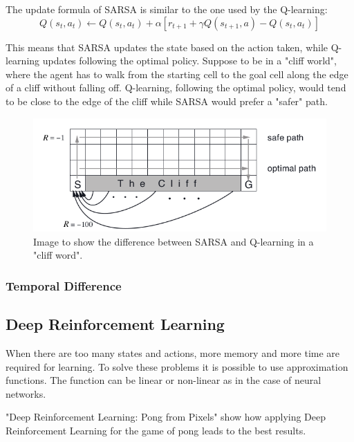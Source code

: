 The update formula of SARSA is similar to the one used by the Q-learning: 
\begin{equation*}
    Q(s_t, a_t) \leftarrow Q(s_t, a_t) + \alpha [r_{t+1} + \gamma Q(s_{t+1}, a) - Q(s_t, a_t)]    
\end{equation*}

This means that SARSA updates the state based on the action taken, while Q-learning updates following the optimal policy.
Suppose to be in a "cliff world", where the agent has to walk from the starting cell to the goal cell along the edge of a cliff without falling off. Q-learning, following the optimal policy, would tend to be close to the edge of the cliff while SARSA would prefer a "safer" path.

\begin{figure}[ht]
    \centering
    \includegraphics[scale=0.4]{images/cliff_word.png}
    \caption{Image to show the difference between SARSA and Q-learning in a "cliff word".}
\end{figure}

\subsubsection{Temporal Difference}

\subsection{Deep Reinforcement Learning}
When there are too many states and actions, more memory and more time are required for learning.
To solve these problems it is possible to use approximation functions.
The function can be linear \cite{melo2008analysis} or non-linear as in the case of neural networks.

\vspace*{4mm}
\noindent
"Deep Reinforcement Learning: Pong from Pixels" \cite{karpathy2016deep} show how applying Deep Reinforcement Learning for the game of pong leads to the best results.

